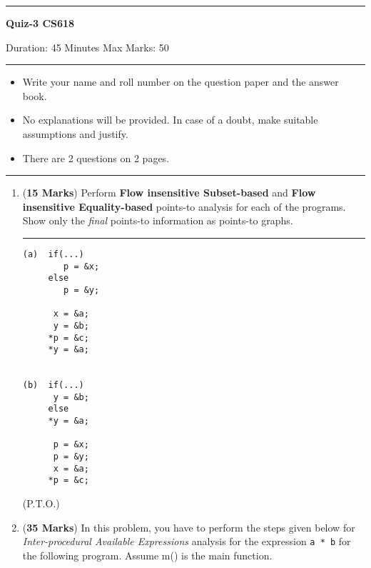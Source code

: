 \documentclass[11pt]{article}
\begin{document}
\noindent \rule{\textwidth}{.2mm}
\begin{center}
{\large {\bf Quiz-3 CS618} }

Duration: 45 Minutes \hfill Max Marks: 50
\end{center} 
\noindent \rule{\textwidth}{.2mm}
\begin{itemize}
\item Write your name and roll number on the question paper and the
  answer book.
\item No explanations will be provided. In case of a doubt, make
  suitable assumptions and justify.
\item There are 2 questions on 2 pages.
\end{itemize}
\noindent \rule{\textwidth}{.2mm}

\begin{enumerate}
\item ({\bf 15 Marks}) Perform {\bf Flow insensitive Subset-based} and {\bf
  Flow insensitive Equality-based} points-to analysis for
  each of the programs. Show only the {\em final} points-to
  information as points-to graphs.
\hrule
  \begin{verbatim}
(a)  if(...)
        p = &x;
     else
        p = &y;

      x = &a;
      y = &b;
     *p = &c;
     *y = &a;


(b)  if(...)
      y = &b;
     else
     *y = &a;

      p = &x;
      p = &y;
      x = &a;
     *p = &c;
  \end{verbatim}
\vfill\mbox{}
\begin{center} (P.T.O.) \end{center}
\clearpage
\item ({\bf 35 Marks}) In this problem, you have to perform the
  steps given below for {\em Inter-procedural Available
    Expressions} analysis for the expression {\tt a * b} for the
  following program. Assume m() is the main function.
  \setcounter{cline}{0} \newcommand{\nline}{%
    \addtocounter{cline}{1} \thecline.\ } \renewcommand{\nline}{}
  

\end{enumerate}
\end{document}
